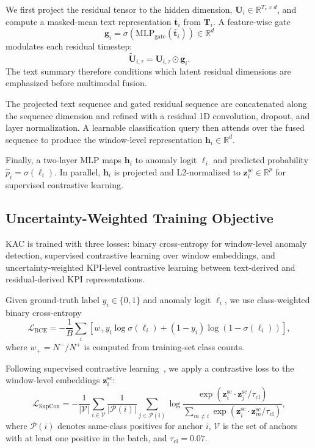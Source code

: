 \documentclass[conference]{IEEEtran}
\begin{document}
We first project the residual tensor to the hidden dimension,
$\mathbf{U}_i \in \mathbb{R}^{T_r \times d}$,
and compute a masked-mean text representation $\bar{\mathbf{t}}_i$ from $\mathbf{T}_i$.
A feature-wise gate
\begin{equation}
\mathbf{g}_i
=
\sigma(\mathrm{MLP}_{\mathrm{gate}}(\bar{\mathbf{t}}_i))
\in
\mathbb{R}^{d}
\end{equation}
modulates each residual timestep:
\begin{equation}
\tilde{\mathbf{U}}_{i,\tau}
=
\mathbf{U}_{i,\tau}
\odot
\mathbf{g}_i.
\end{equation}
The text summary therefore conditions which latent residual dimensions are emphasized before multimodal fusion.

The projected text sequence and gated residual sequence are concatenated along the sequence dimension and refined with a residual 1D convolution, dropout, and layer normalization. A learnable classification query then attends over the fused sequence to produce the window-level representation $\mathbf{h}_i \in \mathbb{R}^{d}$.

Finally, a two-layer MLP maps $\mathbf{h}_i$ to anomaly logit $\ell_i$ and predicted probability $\hat{p}_i=\sigma(\ell_i)$. In parallel, $\mathbf{h}_i$ is projected and L2-normalized to $\mathbf{z}^{\mathrm{sc}}_i \in \mathbb{R}^{p}$ for supervised contrastive learning.
\subsection{Uncertainty-Weighted Training Objective}
\label{sec:objective}

KAC is trained with three losses: binary cross-entropy for window-level anomaly detection, supervised contrastive learning over window embeddings, and uncertainty-weighted KPI-level contrastive learning between text-derived and residual-derived KPI representations.

Given ground-truth label $y_i \in \{0,1\}$ and anomaly logit $\ell_i$, we use class-weighted binary cross-entropy
\begin{equation}
\mathcal{L}_{\mathrm{BCE}}
=
-\frac{1}{B}
\sum_i
\left[
w_+ y_i \log \sigma(\ell_i)
+
(1-y_i)\log(1-\sigma(\ell_i))
\right],
\end{equation}
where $w_+=N^{-}/N^{+}$ is computed from training-set class counts.

Following supervised contrastive learning~\cite{khosla2020supervised}, we apply a contrastive loss to the window-level embeddings $\mathbf{z}^{\mathrm{sc}}_i$:
\begin{equation}
\mathcal{L}_{\mathrm{SupCon}}
=
-\frac{1}{|\mathcal{V}|}
\sum_{i\in\mathcal{V}}
\frac{1}{|\mathcal{P}(i)|}
\sum_{j\in\mathcal{P}(i)}
\log
\frac{
\exp(\mathbf{z}^{\mathrm{sc}}_i \cdot \mathbf{z}^{\mathrm{sc}}_j/\tau_{\mathrm{cl}})
}{
\sum_{m\neq i}
\exp(\mathbf{z}^{\mathrm{sc}}_i \cdot \mathbf{z}^{\mathrm{sc}}_m/\tau_{\mathrm{cl}})
},
\end{equation}
where $\mathcal{P}(i)$ denotes same-class positives for anchor $i$, $\mathcal{V}$ is the set of anchors with at least one positive in the batch, and $\tau_{\mathrm{cl}}=0.07$.
\end{document}

